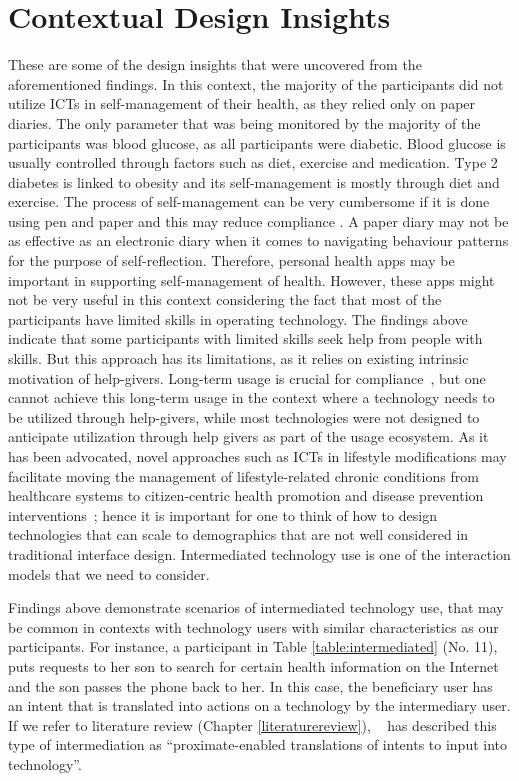 \section{Contextual Design Insights}
These are some of the design insights that were uncovered from the aforementioned findings. In this context, the majority of the participants did not utilize ICTs in self-management of their health, as they relied only on paper diaries. The only parameter that was being monitored by the majority of the participants was blood glucose, as all participants were diabetic. Blood glucose is usually controlled through factors such as diet, exercise and medication. Type 2 diabetes is linked to obesity and its self-management is mostly through diet and exercise.  The process of self-management can be very cumbersome if it is done using pen and paper and this may reduce compliance \citep{mattila2008mobile}. A paper diary may not be as effective as an electronic diary when it comes to navigating behaviour patterns for the purpose of self-reflection. Therefore, personal health apps may be important in supporting self-management of health. However, these apps might not be very useful in this context considering the fact that most of the participants have limited skills in operating technology. The findings above indicate that some participants with limited skills seek help from people with skills. But this approach has its limitations, as it relies on existing intrinsic motivation of help-givers. Long-term usage is crucial for compliance~\citep{mattila2008mobile}, but one cannot achieve this long-term usage in the context where a technology needs to be utilized through help-givers, while most technologies were not designed to anticipate utilization through help givers as part of the usage ecosystem. As it has been advocated, novel approaches such as ICTs in lifestyle modifications may facilitate moving the management of lifestyle-related chronic conditions from healthcare systems to citizen-centric health promotion and disease prevention interventions~\citep{korhonen2010personal}; hence it is important for one to think of how to design technologies that can scale to demographics that are not well considered in traditional interface design. Intermediated technology use  is one of the interaction models that we need to consider.

Findings above demonstrate scenarios of intermediated technology use, that may be common in contexts with technology users with similar characteristics as our participants. For instance, a participant in Table \ref{table:intermediated} (No. 11), puts requests to her son to search for certain health information on the Internet and the son passes the phone back to her. In this case, the beneficiary user has an intent that is translated into actions on a technology by the intermediary user. If we refer to literature review (Chapter \ref{literaturereview}), ~\cite{sambasivan2010} has described this type of intermediation as ``proximate-enabled translations of intents to input into technology''.  

